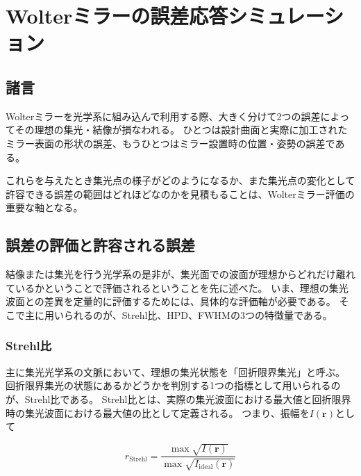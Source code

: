 \chapter{Wolterミラーの誤差応答シミュレーション}
\thispagestyle{empty}
\label{chap2}
\graphicspath{{chap2/figure/}}
\minitoc

\newpage


\section{諸言}
\label{chap2_introduction}

Wolterミラーを光学系に組み込んで利用する際、大きく分けて2つの誤差によってその理想の集光・結像が損なわれる。
ひとつは設計曲面と実際に加工されたミラー表面の形状の誤差、もうひとつはミラー設置時の位置・姿勢の誤差である。

これらを与えたとき集光点の様子がどのようになるか、また集光点の変化として許容できる誤差の範囲はどれほどなのかを見積もることは、Wolterミラー評価の重要な軸となる。

\clearpage
\newpage
\section{誤差の評価と許容される誤差}
\label{chap2_beam_evaluation_standard}

結像または集光を行う光学系の是非が、集光面での波面が理想からどれだけ離れているかということで評価されるということを先に述べた。
いま、理想の集光波面との差異を定量的に評価するためには、具体的な評価軸が必要である。
そこで主に用いられるのが、Strehl比、HPD、FWHMの3つの特徴量である。

\subsection{Strehl比}
\label{chap2_strehl_ratio}
主に集光光学系の文脈において、理想の集光状態を「回折限界集光」と呼ぶ。
回折限界集光の状態にあるかどうかを判別する1つの指標として用いられるのが、Strehl比である。
Strehl比とは、実際の集光波面における最大値と回折限界時の集光波面における最大値の比として定義される。
つまり、振幅を$I(\mathbf{r})$として

\[
r_{\mathrm{Strehl}} = \frac{ \max{\sqrt{I(\mathbf{r})} } }{ \max{ \sqrt{I_{\mathrm{ideal}}( \mathbf{r} )} } }
\]

